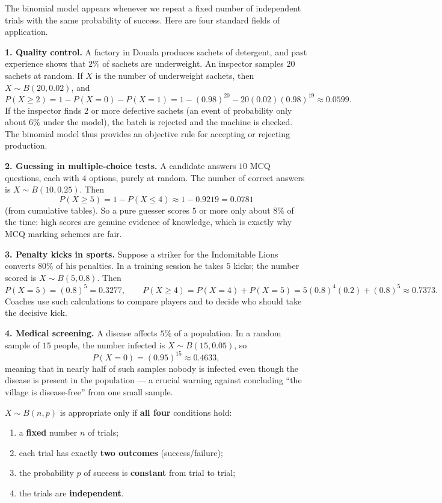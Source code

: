 \documentclass[11pt]{article}
\newcounter{popsec}
\newcounter{popsub}
\newcommand{\courssub}[1]{%
  \stepcounter{popsub}%
  \par\vspace{9pt}\noindent{\popxbold\fontsize{11.5}{13}\selectfont\color{popink}{\color{poporange}\thepopsec.\thepopsub}\hspace{6pt}#1}\par\nopagebreak\vspace{4pt}
}
\begin{document}
The binomial model appears whenever we repeat a fixed number of independent trials with the same probability of success. Here are four standard fields of application.

\textbf{1. Quality control.} A factory in Douala produces sachets of detergent, and past experience shows that $2\%$ of sachets are underweight. An inspector samples $20$ sachets at random. If $X$ is the number of underweight sachets, then $X\sim B(20,0.02)$, and
\[ P(X\ge 2)=1-P(X=0)-P(X=1)=1-(0.98)^{20}-20(0.02)(0.98)^{19}\approx 0.0599. \]
If the inspector finds $2$ or more defective sachets (an event of probability only about $6\%$ under the model), the batch is rejected and the machine is checked. The binomial model thus provides an objective rule for accepting or rejecting production.

\textbf{2. Guessing in multiple-choice tests.} A candidate answers $10$ MCQ questions, each with $4$ options, purely at random. The number of correct answers is $X\sim B(10,0.25)$. Then
\[ P(X\ge 5)=1-P(X\le 4)\approx 1-0.9219=0.0781 \]
(from cumulative tables). So a pure guesser scores $5$ or more only about $8\%$ of the time: high scores are genuine evidence of knowledge, which is exactly why MCQ marking schemes are fair.

\textbf{3. Penalty kicks in sports.} Suppose a striker for the Indomitable Lions converts $80\%$ of his penalties. In a training session he takes $5$ kicks; the number scored is $X\sim B(5,0.8)$. Then
\[ P(X=5)=(0.8)^5=0.3277,\qquad P(X\ge 4)=P(X=4)+P(X=5)=5(0.8)^4(0.2)+(0.8)^5\approx 0.7373. \]
Coaches use such calculations to compare players and to decide who should take the decisive kick.

\textbf{4. Medical screening.} A disease affects $5\%$ of a population. In a random sample of $15$ people, the number infected is $X\sim B(15,0.05)$, so
\[ P(X=0)=(0.95)^{15}\approx 0.4633, \]
meaning that in nearly half of such samples nobody is infected even though the disease is present in the population --- a crucial warning against concluding ``the village is disease-free'' from one small sample.

\courssub{When Is the Binomial Model Appropriate?}

\begin{aretenir}
$X\sim B(n,p)$ is appropriate only if \textbf{all four} conditions hold:
\begin{enumerate}
\item a \textbf{fixed} number $n$ of trials;
\item each trial has exactly \textbf{two outcomes} (success/failure);
\item the probability $p$ of success is \textbf{constant} from trial to trial;
\item the trials are \textbf{independent}.
\end{enumerate}
\end{aretenir}
\end{document}
